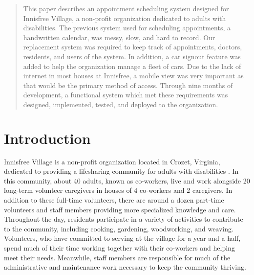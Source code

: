 \documentclass{sig-alternate}
\begin{document}
\maketitle
\begin{abstract}
This paper describes an appointment scheduling system designed for Innisfree Village, a non-profit organization dedicated to adults with disabilities. The previous system used for scheduling appointments, a handwritten calendar, was messy, slow, and hard to record. Our replacement system was required to keep track of appointments, doctors, residents, and users of the system. In addition, a car signout feature was added to help the organization manage a fleet of cars. Due to the lack of internet in most houses at Innisfree, a mobile view was very important as that would be the primary method of access. Through nine months of development, a functional system which met these requirements was designed, implemented, tested, and deployed to the organization.
\end{abstract}




\section{Introduction}
Innisfree Village is a non-profit organization located in Crozet, Virginia, dedicated to providing a lifesharing community for adults with disabilities \cite{innisfree}. In this community, about 40 adults, known as co-workers, live and work alongside 20 long-term volunteer caregivers in houses of 4 co-workers and 2 caregivers. In addition to these full-time volunteers, there are around a dozen part-time volunteers and staff members providing more specialized knowledge and care. Throughout the day, residents participate in a variety of activities to contribute to the community, including cooking, gardening, woodworking, and weaving. Volunteers, who have committed to serving at the village for a year and a half, spend much of their time working together with their co-workers and helping meet their needs. Meanwhile, staff members are responsible for much of the administrative and maintenance work necessary to keep the community thriving.
\end{document}
